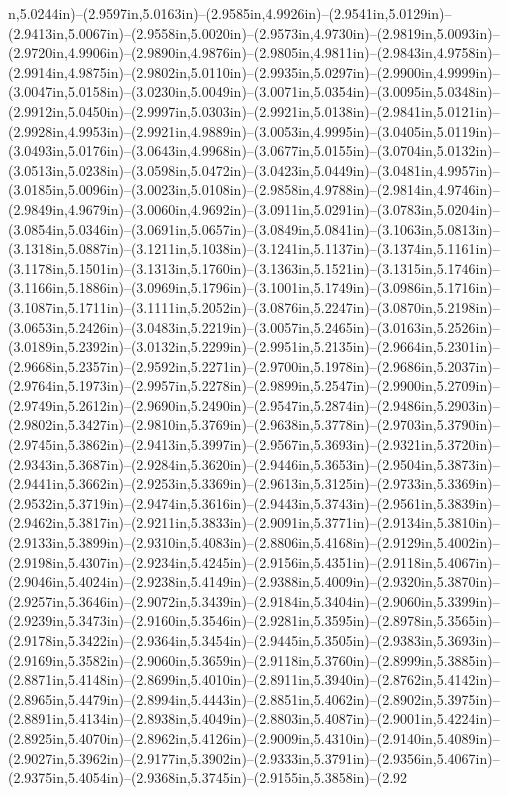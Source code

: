 n,5.0244in)--(2.9597in,5.0163in)--(2.9585in,4.9926in)--(2.9541in,5.0129in)--(2.9413in,5.0067in)--(2.9558in,5.0020in)--(2.9573in,4.9730in)--(2.9819in,5.0093in)--(2.9720in,4.9906in)--(2.9890in,4.9876in)--(2.9805in,4.9811in)--(2.9843in,4.9758in)--(2.9914in,4.9875in)--(2.9802in,5.0110in)--(2.9935in,5.0297in)--(2.9900in,4.9999in)--(3.0047in,5.0158in)--(3.0230in,5.0049in)--(3.0071in,5.0354in)--(3.0095in,5.0348in)--(2.9912in,5.0450in)--(2.9997in,5.0303in)--(2.9921in,5.0138in)--(2.9841in,5.0121in)--(2.9928in,4.9953in)--(2.9921in,4.9889in)--(3.0053in,4.9995in)--(3.0405in,5.0119in)--(3.0493in,5.0176in)--(3.0643in,4.9968in)--(3.0677in,5.0155in)--(3.0704in,5.0132in)--(3.0513in,5.0238in)--(3.0598in,5.0472in)--(3.0423in,5.0449in)--(3.0481in,4.9957in)--(3.0185in,5.0096in)--(3.0023in,5.0108in)--(2.9858in,4.9788in)--(2.9814in,4.9746in)--(2.9849in,4.9679in)--(3.0060in,4.9692in)--(3.0911in,5.0291in)--(3.0783in,5.0204in)--(3.0854in,5.0346in)--(3.0691in,5.0657in)--(3.0849in,5.0841in)--(3.1063in,5.0813in)--(3.1318in,5.0887in)--(3.1211in,5.1038in)--(3.1241in,5.1137in)--(3.1374in,5.1161in)--(3.1178in,5.1501in)--(3.1313in,5.1760in)--(3.1363in,5.1521in)--(3.1315in,5.1746in)--(3.1166in,5.1886in)--(3.0969in,5.1796in)--(3.1001in,5.1749in)--(3.0986in,5.1716in)--(3.1087in,5.1711in)--(3.1111in,5.2052in)--(3.0876in,5.2247in)--(3.0870in,5.2198in)--(3.0653in,5.2426in)--(3.0483in,5.2219in)--(3.0057in,5.2465in)--(3.0163in,5.2526in)--(3.0189in,5.2392in)--(3.0132in,5.2299in)--(2.9951in,5.2135in)--(2.9664in,5.2301in)--(2.9668in,5.2357in)--(2.9592in,5.2271in)--(2.9700in,5.1978in)--(2.9686in,5.2037in)--(2.9764in,5.1973in)--(2.9957in,5.2278in)--(2.9899in,5.2547in)--(2.9900in,5.2709in)--(2.9749in,5.2612in)--(2.9690in,5.2490in)--(2.9547in,5.2874in)--(2.9486in,5.2903in)--(2.9802in,5.3427in)--(2.9810in,5.3769in)--(2.9638in,5.3778in)--(2.9703in,5.3790in)--(2.9745in,5.3862in)--(2.9413in,5.3997in)--(2.9567in,5.3693in)--(2.9321in,5.3720in)--(2.9343in,5.3687in)--(2.9284in,5.3620in)--(2.9446in,5.3653in)--(2.9504in,5.3873in)--(2.9441in,5.3662in)--(2.9253in,5.3369in)--(2.9613in,5.3125in)--(2.9733in,5.3369in)--(2.9532in,5.3719in)--(2.9474in,5.3616in)--(2.9443in,5.3743in)--(2.9561in,5.3839in)--(2.9462in,5.3817in)--(2.9211in,5.3833in)--(2.9091in,5.3771in)--(2.9134in,5.3810in)--(2.9133in,5.3899in)--(2.9310in,5.4083in)--(2.8806in,5.4168in)--(2.9129in,5.4002in)--(2.9198in,5.4307in)--(2.9234in,5.4245in)--(2.9156in,5.4351in)--(2.9118in,5.4067in)--(2.9046in,5.4024in)--(2.9238in,5.4149in)--(2.9388in,5.4009in)--(2.9320in,5.3870in)--(2.9257in,5.3646in)--(2.9072in,5.3439in)--(2.9184in,5.3404in)--(2.9060in,5.3399in)--(2.9239in,5.3473in)--(2.9160in,5.3546in)--(2.9281in,5.3595in)--(2.8978in,5.3565in)--(2.9178in,5.3422in)--(2.9364in,5.3454in)--(2.9445in,5.3505in)--(2.9383in,5.3693in)--(2.9169in,5.3582in)--(2.9060in,5.3659in)--(2.9118in,5.3760in)--(2.8999in,5.3885in)--(2.8871in,5.4148in)--(2.8699in,5.4010in)--(2.8911in,5.3940in)--(2.8762in,5.4142in)--(2.8965in,5.4479in)--(2.8994in,5.4443in)--(2.8851in,5.4062in)--(2.8902in,5.3975in)--(2.8891in,5.4134in)--(2.8938in,5.4049in)--(2.8803in,5.4087in)--(2.9001in,5.4224in)--(2.8925in,5.4070in)--(2.8962in,5.4126in)--(2.9009in,5.4310in)--(2.9140in,5.4089in)--(2.9027in,5.3962in)--(2.9177in,5.3902in)--(2.9333in,5.3791in)--(2.9356in,5.4067in)--(2.9375in,5.4054in)--(2.9368in,5.3745in)--(2.9155in,5.3858in)--(2.92
